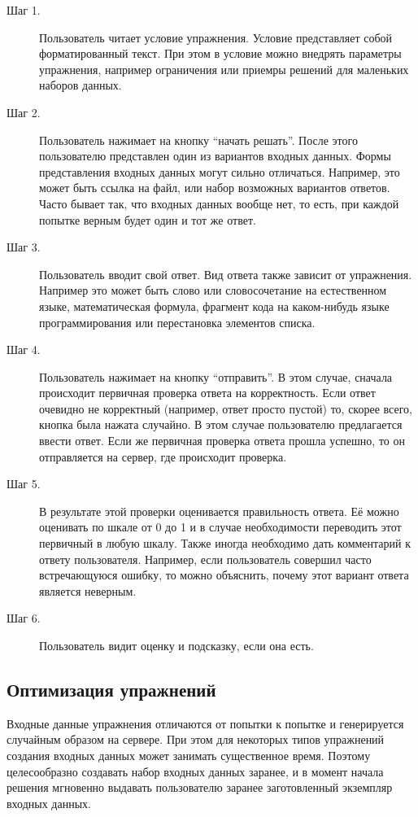 \documentclass{matmex-diploma-custom}
\begin{document}
\begin{description}
\item[Шаг 1.] Пользователь читает условие упражнения. Условие
  представляет собой форматированный текст. При этом в условие можно
  внедрять параметры упражнения, например ограничения или приемры
  решений для маленьких наборов данных.

\item[Шаг 2.] Пользователь нажимает на кнопку ``начать решать''.
  После этого пользователю представлен один из вариантов входных
  данных. Формы представления входных данных могут сильно
  отличаться. Например, это может быть ссылка на файл, или
  набор возможных вариантов ответов. Часто бывает так, что входных
  данных вообще нет, то есть, при каждой попытке верным будет один и тот
  же ответ.
\item[Шаг 3.] Пользователь вводит свой ответ. Вид ответа также
  зависит от упражнения. Например это может быть слово или
  словосочетание на естественном языке, математическая формула, фрагмент
  кода на каком-нибудь языке программирования или перестановка элементов
  списка.
\item[Шаг 4.] Пользователь нажимает на кнопку ``отправить''. В этом
  случае, сначала происходит первичная проверка ответа на
  корректность. Если ответ очевидно не корректный (например, ответ
  просто пустой) то, скорее всего, кнопка была нажата случайно. В этом
  случае пользователю предлагается ввести ответ. Если же первичная
  проверка ответа прошла успешно, то он отправляется на сервер, где
  происходит проверка.
\item[Шаг 5.] В результате этой проверки оценивается правильность
  ответа. Её можно оценивать по шкале от 0 до 1 и в случае необходимости
  переводить этот первичный в любую шкалу. Также иногда необходимо дать
  комментарий к ответу пользователя. Например, если пользователь
  совершил часто встречающуюся ошибку, то можно объяснить, почему этот
  вариант ответа является неверным.
\item[Шаг 6.] Пользователь видит оценку и подсказку, если она есть.
\end{description}

\subsection{Оптимизация упражнений}
Входные данные упражнения отличаются от попытки к попытке и
генерируется случайным образом на сервере. При этом для некоторых
типов упражнений создания входных данных может занимать существенное
время. Поэтому целесообразно создавать набор входных данных заранее, и
в момент начала решения мгновенно выдавать пользователю заранее
заготовленный экземпляр входных данных.
\end{document}
